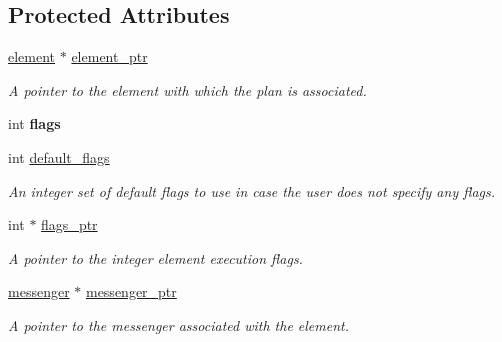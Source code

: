 \subsection*{Protected Attributes}
\begin{DoxyCompactItemize}
\item 
\hypertarget{classbases_1_1plan_a54cd8904b8d499e5fc01c8060021d47b}{\hyperlink{classbases_1_1element}{element} $\ast$ \hyperlink{classbases_1_1plan_a54cd8904b8d499e5fc01c8060021d47b}{element\-\_\-ptr}}\label{classbases_1_1plan_a54cd8904b8d499e5fc01c8060021d47b}

\begin{DoxyCompactList}\small\item\em A pointer to the element with which the plan is associated. \end{DoxyCompactList}\item 
\hypertarget{classbases_1_1plan_ad8a2f8000cca7764e9a057c3da1618c4}{int {\bfseries flags}}\label{classbases_1_1plan_ad8a2f8000cca7764e9a057c3da1618c4}

\item 
\hypertarget{classbases_1_1plan_a756595e230cc99e84de4392ac691eefd}{int \hyperlink{classbases_1_1plan_a756595e230cc99e84de4392ac691eefd}{default\-\_\-flags}}\label{classbases_1_1plan_a756595e230cc99e84de4392ac691eefd}

\begin{DoxyCompactList}\small\item\em An integer set of default flags to use in case the user does not specify any flags. \end{DoxyCompactList}\item 
\hypertarget{classbases_1_1plan_a4f423a3831579d895a0658164bb82b8c}{int $\ast$ \hyperlink{classbases_1_1plan_a4f423a3831579d895a0658164bb82b8c}{flags\-\_\-ptr}}\label{classbases_1_1plan_a4f423a3831579d895a0658164bb82b8c}

\begin{DoxyCompactList}\small\item\em A pointer to the integer element execution flags. \end{DoxyCompactList}\item 
\hypertarget{classbases_1_1plan_ac2a21aeb561224e01b1fc989e752131a}{\hyperlink{classbases_1_1messenger}{messenger} $\ast$ \hyperlink{classbases_1_1plan_ac2a21aeb561224e01b1fc989e752131a}{messenger\-\_\-ptr}}\label{classbases_1_1plan_ac2a21aeb561224e01b1fc989e752131a}

\begin{DoxyCompactList}\small\item\em A pointer to the messenger associated with the element. \end{DoxyCompactList}\end{DoxyCompactItemize}


